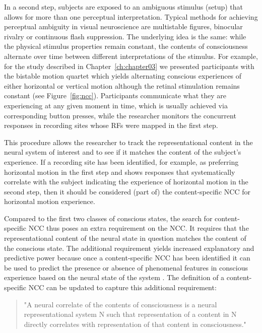 In a second step, subjects are exposed to an ambiguous stimulus (setup) that allows for more than one perceptual interpretation. Typical methods for achieving perceptual ambiguity in visual neuroscience are multistable figures, binocular rivalry or continuous flash suppression. The underlying idea is the same: while the physical stimulus properties remain constant, the contents of consciousness alternate over time between different interpretations of the stimulus. For example, for the study described in Chapter~\ref{ch:chapter03} we presented participants with the bistable motion quartet \parencite{Ramachandran1985} which yields alternating conscious experiences of either horizontal or vertical motion although the retinal stimulation remains constant (see Figure~\ref{fig:ncc}). Participants communicate what they are experiencing at any given moment in time, which is usually achieved via corresponding button presses, while the researcher monitors the concurrent responses in recording sites whose RFs were mapped in the first step.

This procedure allows the researcher to track the representational content in the neural system of interest and to see if it matches the content of the subject's experience. If a recording site has been identified, for example, as preferring horizontal motion in the first step and shows responses that systematically correlate with the subject indicating the experience of horizontal motion in the second step, then it should be considered (part of) the content-specific NCC for horizontal motion experience.

Compared to the first two classes of conscious states, the search for content-specific NCC thus poses an extra requirement on the NCC. It requires that the representational content of the neural state in question matches the content of the conscious state. The additional requirement yields increased explanatory and predictive power because once a content-specific NCC has been identified it can be used to predict the presence or absence of phenomenal features in conscious experience based on the neural state of the system \parencite{Chalmers2000}. The definition of a content-specific NCC can be updated to capture this additional requirement:

\begin{quotation}
"A neural correlate of the contents of consciousness is a neural representational system N such that representation of a content in N directly correlates with representation of that content in consciousness." \parencite[p. 6]{Chalmers2000}
\end{quotation}

